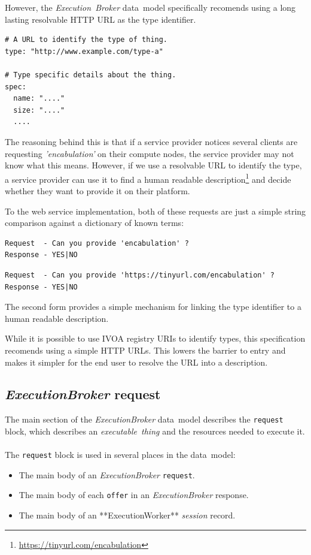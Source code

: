 \documentclass[11pt,a4paper]{ivoa}
\newcommand{\datamodel} {data~model}
\newcommand{\webservice} {web service}
\newcommand{\ivoa} {IVOA}
\newcommand{\execworkerclass} {**ExecutionWorker**}
\newcommand{\execbrokerclass} {\textit{ExecutionBroker}}
\newcommand{\executionbroker} {\textit{Execution~Broker}}
\newcommand{\executablething}[1] {\textit{executable~thing#1}}
\newcommand{\workerjob}[1] {\textit{session#1}}
\newcommand{\codeword}[1] {\texttt{#1}}
\newcommand{\footurl}[1] {\footnote{\url{#1}}}
\begin{document}
However, the \executionbroker{} \datamodel{} specifically recomends using a long lasting resolvable
HTTP URL as the type identifier.

\begin{lstlisting}[]
# A URL to identify the type of thing.
type: "http://www.example.com/type-a"

# Type specific details about the thing.
spec:
  name: "...."
  size: "...."
  ....
\end{lstlisting}

The reasoning behind this is that if a service provider notices several clients are requesting
\textit{'encabulation'} on their compute nodes, the service provider may not know what this means.
However, if we use a resolvable URL to identify the type, a service provider can use it to find a
human readable description\footurl{https://tinyurl.com/encabulation} and decide whether they want
to provide it on their platform.

To the \webservice{} implementation, both of these requests are just a simple string comparison against a
dictionary of known terms:

\begin{lstlisting}[]
Request  - Can you provide 'encabulation' ?
Response - YES|NO
\end{lstlisting}

\begin{lstlisting}[]
Request  - Can you provide 'https://tinyurl.com/encabulation' ?
Response - YES|NO
\end{lstlisting}

The second form provides a simple mechanism for linking the type identifier to a human readable description.

While it is possible to use \ivoa{} registry URIs to identify types, this specification
recomends using a simple HTTP URLs. This lowers the barrier to entry and makes it simpler for the end user
to resolve the URL into a description.

\subsection{\execbrokerclass{} request}
\label{sub-datamodel-request}

The main section of the \execbrokerclass{} \datamodel{} describes the \codeword{request} block,
which describes an \executablething{} and the resources needed to execute it.
\\
\\
The \codeword{request} block is used in several places in the \datamodel{}:
\begin{itemize}
    \item The main body of an \execbrokerclass{} \codeword{request}.
    \item The main body of each \codeword{offer} in an \execbrokerclass{} response.
    \item The main body of an \execworkerclass{} \workerjob{} record.
\end{itemize}
\end{document}
